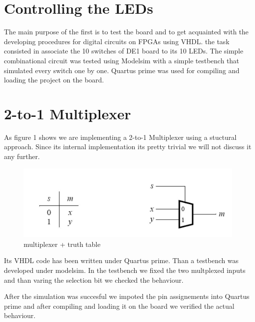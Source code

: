 \documentclass[12pt]{article}
\begin{document}

\section{ Controlling the LEDs }

The main purpose of the first is to test the board and to get acquainted with the developing procedures for digital circuits on FPGAs using VHDL.
the task consisted in associate the 10 switches of DE1 board to its 10 LEDs.
The simple combinational circuit was tested using Modelsim with a simple testbench that simulated every switch one by one.
Quartus prime was used for compiling and loading the project on the board.
\section{2-to-1 Multiplexer}
As figure 1 shows we are implementing a 2-to-1 Multiplexer using a stuctural approach. Since its internal implementation its pretty trivial we will not discuss it any further.

\begin{figure}[h]
	\centering
	\includegraphics[scale = 0.5]{image2.jpg}
	\caption{multiplexer + truth table}
\end{figure}

Its VHDL code has been written under Quartus prime. Than a testbench was developed under modelsim. In the testbench we fixed the two multplexed inputs and than varing the selection bit we checked the behaviour.

After the simulation was succesful we impoted the pin assignements into Quartus prime and after compiling and loading it on the board we verified the actual behaviour.
\\\\
\end{document}

